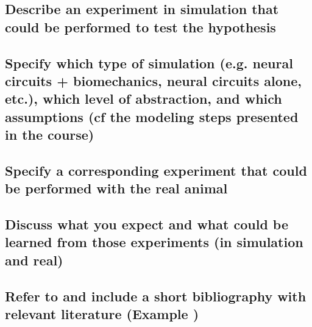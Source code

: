 \documentclass{cmc}
\begin{document}
\subsection{Describe an experiment in simulation that could be
  performed to test the hypothesis}
\subsection{Specify which type of simulation (e.g. neural circuits +
  biomechanics, neural circuits alone, etc.), which level of
  abstraction, and which assumptions (cf the modeling steps presented
  in the course)}
\subsection{Specify a corresponding experiment that could be performed
  with the real animal}
\subsection{Discuss what you expect and what could be learned from
  those experiments (in simulation and real)}
\subsection{Refer to and include a short bibliography with relevant
  literature (Example \cite{ijspeert2007swimming})}


\newpage

\label{sec:references}




\end{document}
